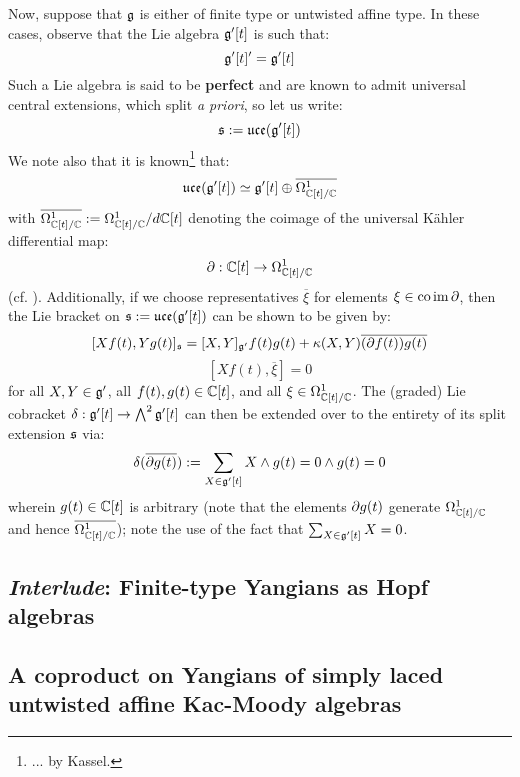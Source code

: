             Now, suppose that $\mathfrak{g}$ is either of finite type or untwisted affine type. In these cases, observe that the Lie algebra $\mathfrak{g}'[t]$ is such that:
                $$\mathfrak{g}'[t]' = \mathfrak{g}'[t]$$
            Such a Lie algebra is said to be \textbf{perfect} and are known to admit universal central extensions, which split \textit{a priori}, so let us write:
                $$\mathfrak{s} := \mathfrak{uce}(\mathfrak{g}'[t])$$
            We note also that it is known\footnote{... by Kassel.} that:
                $$\mathfrak{uce}(\mathfrak{g}'[t]) \simeq \mathfrak{g}'[t] \oplus \overline{\Omega^1_{\mathbb{C}[t]/\mathbb{C}}}$$ 
            with $\overline{\Omega^1_{\mathbb{C}[t]/\mathbb{C}}} := \Omega^1_{\mathbb{C}[t]/\mathbb{C}}/d \mathbb{C}[t]$ denoting the coimage of the universal K\"ahler differential map:
                $$\partial: \mathbb{C}[t] \to \Omega^1_{\mathbb{C}[t]/\mathbb{C}}$$
            (cf. \cite{stacks}). Additionally, if we choose representatives $\overline{\xi}$ for elements $\xi \in \mathrm{co}\operatorname{im} \partial$, then the Lie bracket on $\mathfrak{s} := \mathfrak{uce}(\mathfrak{g}'[t])$ can be shown to be given by:
                $$[X f(t), Y g(t)]_{\mathfrak{s}} = [X, Y]_{\mathfrak{g}'} f(t)g(t) + \kappa(X, Y) \overline{(\partial f(t)) g(t)}$$
                $$[X f(t), \overline{\xi}] = 0$$
            for all $X, Y \in \mathfrak{g}'$, all $f(t), g(t) \in \mathbb{C}[t]$, and all $\xi \in \Omega^1_{\mathbb{C}[t]/\mathbb{C}}$. The (graded) Lie cobracket $\delta: \mathfrak{g}'[t] \to \bigwedge^2 \mathfrak{g}'[t]$ can then be extended over to the entirety of its split extension $\mathfrak{s}$ via:
                $$\delta( \overline{\partial g(t)} ) := \sum_{ X \in \mathfrak{g}'[t] } X \wedge g(t) = 0 \wedge g(t) = 0$$
            wherein $g(t) \in \mathbb{C}[t]$ is arbitrary (note that the elements $\partial g(t)$ generate $\Omega^1_{\mathbb{C}[t]/\mathbb{C}}$ and hence $\overline{\Omega^1_{\mathbb{C}[t]/\mathbb{C}}}$); note the use of the fact that $\sum_{ X \in \mathfrak{g}'[t] } X = 0$.

        \subsection{\textit{Interlude}: Finite-type Yangians as Hopf algebras}

        \subsection{A coproduct on Yangians of simply laced untwisted affine Kac-Moody algebras}
    
    \printbibliography

